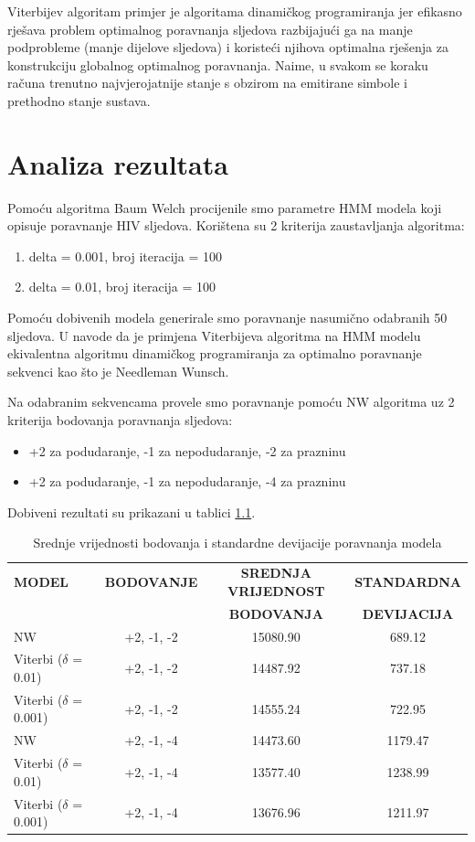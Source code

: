 \documentclass[times, utf8, seminar, numeric]{fer}
\begin{document}
 Viterbijev algoritam primjer je algoritama dinamičkog programiranja jer efikasno rješava problem optimalnog poravnanja sljedova razbijajući ga na manje podprobleme (manje dijelove sljedova) i koristeći njihova optimalna rješenja za konstrukciju globalnog optimalnog poravnanja. Naime, u svakom se koraku računa trenutno najvjerojatnije stanje s obzirom na emitirane simbole i prethodno stanje sustava.


\chapter{Analiza rezultata}
Pomoću algoritma Baum Welch procijenile smo parametre HMM modela koji opisuje poravnanje HIV sljedova. Korištena su 2 kriterija zaustavljanja algoritma: \begin{enumerate}
	\item delta = 0.001, broj iteracija = 100
	\item delta = 0.01, broj iteracija = 100
\end{enumerate}
Pomoću dobivenih modela generirale smo poravnanje nasumično odabranih 50 sljedova. U \cite{durbin1998biological} navode da je primjena Viterbijeva algoritma na HMM modelu ekivalentna algoritmu dinamičkog programiranja za optimalno poravnanje sekvenci kao što je Needleman Wunsch. 

Na odabranim sekvencama provele smo poravnanje pomoću NW algoritma uz 2 kriterija bodovanja poravnanja sljedova:
\begin{itemize}
	\item +2 za podudaranje, -1 za nepodudaranje, -2 za prazninu
	\item +2 za podudaranje, -1 za nepodudaranje, -4 za prazninu
\end{itemize} 

Dobiveni rezultati su prikazani u tablici \ref{tab:rezultati}.

\begin{table}[ht]
	\centering
	\small %
	\begin{tabular}{lccc}
		  \toprule
		\textbf{MODEL} & \textbf{BODOVANJE} & \textbf{SREDNJA VRIJEDNOST} & \textbf{STANDARDNA}} \\
		& & \textbf{BODOVANJA} & \textbf{DEVIJACIJA} \\
		\midrule
	
		\midrule
		
		NW & +2, -1, -2 & 15080.90 & 689.12\\
		Viterbi ($\delta$ = 0.01) & +2, -1, -2 & 14487.92 & 737.18 \\
		Viterbi ($\delta$ = 0.001) & +2, -1, -2 & 14555.24 & 722.95 \\
		NW & +2, -1, -4 & 14473.60 & 1179.47 \\
		Viterbi ($\delta$ = 0.01)  & +2, -1, -4 & 13577.40 & 1238.99 \\
		Viterbi ($\delta$ = 0.001) & +2, -1, -4 & 13676.96 & 1211.97 \\
		\bottomrule
	\end{tabular}
	\caption{Srednje vrijednosti bodovanja i standardne devijacije poravnanja modela}
	\label{tab:rezultati}
\end{table}
\end{document}
